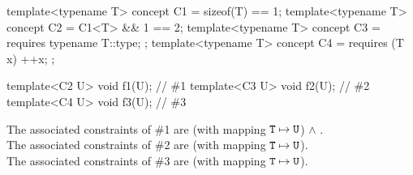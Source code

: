 \documentclass{wg21}
\begin{document}
\pnum
\begin{example}
    \begin{codeblock}
        template<typename T> concept C1 = sizeof(T) == 1;
        template<typename T> concept C2 = C1<T> && 1 == 2;
        template<typename T> concept C3 = requires { typename T::type; };
        template<typename T> concept C4 = requires (T x) { ++x; };

        template<C2 U> void f1(U);      // \#1
        template<C3 U> void f2(U);      // \#2
        template<C4 U> void f3(U);      // \#3
    \end{codeblock}
    The associated constraints of \#1 are
     (with mapping $\texttt{T} \mapsto \texttt{U}$) $\land$ .\\
    The associated constraints of \#2 are
     (with mapping $\texttt{T} \mapsto \texttt{U}$).\\
    The associated constraints of \#3 are
     (with mapping $\texttt{T} \mapsto \texttt{U}$).
\end{example}
\end{document}
